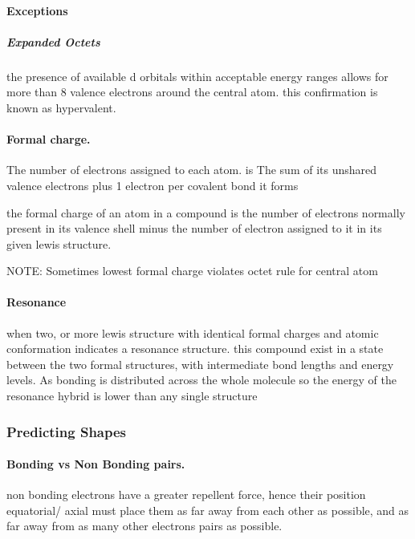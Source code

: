 \documentclass[]{article}
\let\oldparagraph\paragraph
\renewcommand{\paragraph}[1]{\oldparagraph{#1}\mbox{}}
\let\oldsubparagraph\subparagraph
\renewcommand{\subparagraph}[1]{\oldsubparagraph{#1}\mbox{}}
\begin{document}
\paragraph{Exceptions}\label{exceptions-1}

\subparagraph{Expanded Octets}\label{expanded-octets}

the presence of available d orbitals within acceptable energy ranges
allows for more than 8 valence electrons around the central atom. this
confirmation is known as hypervalent.

\paragraph{Formal charge.}\label{formal-charge.}

The number of electrons assigned to each atom. is The sum of its
unshared valence electrons plus 1 electron per covalent bond it forms

the formal charge of an atom in a compound is the number of electrons
normally present in its valence shell minus the number of electron
assigned to it in its given lewis structure.

NOTE: Sometimes lowest formal charge violates octet rule for central
atom

\paragraph{Resonance}\label{resonance}

when two, or more lewis structure with identical formal charges and
atomic conformation indicates a resonance structure. this compound exist
in a state between the two formal structures, with intermediate bond
lengths and energy levels. As bonding is distributed across the whole
molecule so the energy of the resonance hybrid is lower than any single
structure

\subsubsection{Predicting Shapes}\label{predicting-shapes}

\paragraph{Bonding vs Non Bonding
pairs.}\label{bonding-vs-non-bonding-pairs.}

non bonding electrons have a greater repellent force, hence their
position equatorial/ axial must place them as far away from each other
as possible, and as far away from as many other electrons pairs as
possible.
\end{document}
